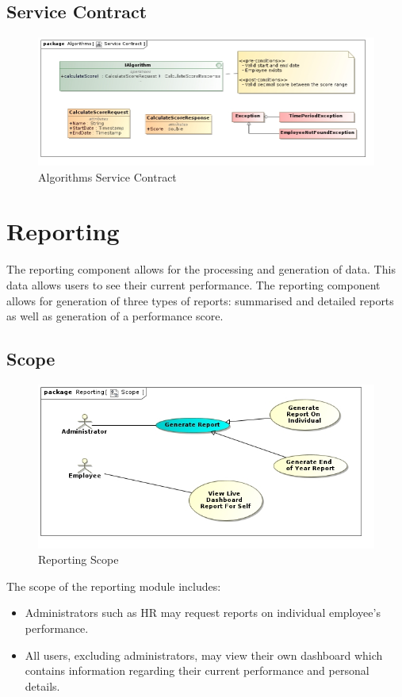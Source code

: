 \documentclass[11pt,a4paper]{article}
\begin{document}
\subsection{Service Contract}
\begin{figure}[H]
	\begin{center}
		\includegraphics[width=\linewidth]{../Images/Algorithms_Service_Contract.jpg}
		\caption{Algorithms Service Contract}
	\end{center}
\end{figure}

\pagebreak

\section{Reporting}

The reporting component allows for the processing and generation of data. This data allows users to see their current performance. The reporting component allows for generation of three types of reports: summarised and detailed reports as well as generation of a performance score.

\subsection{Scope}
\begin{figure}[h!]
		\includegraphics[width=\linewidth]{../Images/Reporting Scope.jpg}
		\caption{Reporting Scope}
		\centering
\end{figure}
The scope of the reporting module includes:
\begin{itemize}
	\item Administrators such as HR may request reports on individual employee's performance.
	\item All users, excluding administrators, may view their own dashboard which contains information regarding their current performance and personal details.
\end{itemize}
\end{document}
